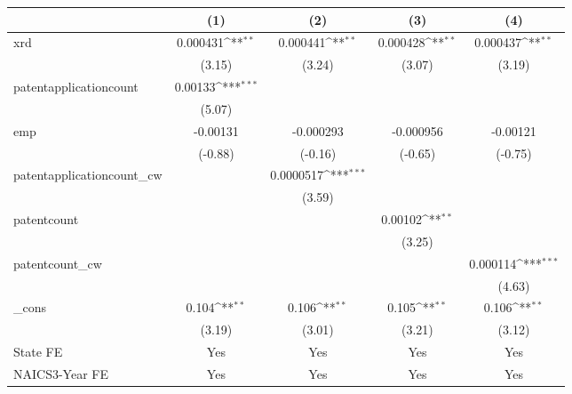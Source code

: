 {
\def\sym#1{\ifmmode^{#1}\else\(^{#1}\)\fi}
\begin{tabular}{l*{4}{c}}
\hline\hline
            &\multicolumn{1}{c}{(1)}         &\multicolumn{1}{c}{(2)}         &\multicolumn{1}{c}{(3)}         &\multicolumn{1}{c}{(4)}         \\
\hline
xrd         &    0.000431\sym{**} &    0.000441\sym{**} &    0.000428\sym{**} &    0.000437\sym{**} \\
            &      (3.15)         &      (3.24)         &      (3.07)         &      (3.19)         \\
[1em]
patentapplicationcount&     0.00133\sym{***}&                     &                     &                     \\
            &      (5.07)         &                     &                     &                     \\
[1em]
emp         &    -0.00131         &   -0.000293         &   -0.000956         &    -0.00121         \\
            &     (-0.88)         &     (-0.16)         &     (-0.65)         &     (-0.75)         \\
[1em]
patentapplicationcount\_cw&                     &   0.0000517\sym{***}&                     &                     \\
            &                     &      (3.59)         &                     &                     \\
[1em]
patentcount &                     &                     &     0.00102\sym{**} &                     \\
            &                     &                     &      (3.25)         &                     \\
[1em]
patentcount\_cw&                     &                     &                     &    0.000114\sym{***}\\
            &                     &                     &                     &      (4.63)         \\
[1em]
\_cons      &       0.104\sym{**} &       0.106\sym{**} &       0.105\sym{**} &       0.106\sym{**} \\
            &      (3.19)         &      (3.01)         &      (3.21)         &      (3.12)         \\
[1em]
State FE    &         Yes         &         Yes         &         Yes         &         Yes         \\
[1em]
NAICS3-Year FE&         Yes         &         Yes         &         Yes         &         Yes         \\

\end{tabular}}

